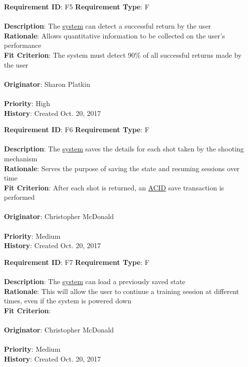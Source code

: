 \documentclass[11pt]{article}
\begin{document}
\begin{framed}
	\noindent\textbf{Requirement ID}: F5 \hfill \textbf{Requirement Type}: F \hfill\\\\
	\noindent\textbf{Description}: The \hyperref[sec:definitions]{system} can detect a successful return by the user \\
	\textbf{Rationale}: Allows quantitative information to be collected on the user's performance \\
	\textbf{Fit Criterion}: The system must detect 90\% of all successful returns made by the user\\\\
	\textbf{Originator}: Sharon Platkin \\\\
	\textbf{Priority}: High \hfill \\
	\noindent\textbf{History}: Created Oct. 20, 2017
\end{framed}

\begin{framed}
	\noindent\textbf{Requirement ID}: F6 \hfill \textbf{Requirement Type}: F \hfill\\\\
	\noindent\textbf{Description}: The \hyperref[sec:definitions]{system} saves the details for each shot taken by the shooting mechanism \\
	\textbf{Rationale}: Serves the purpose of saving the state and resuming sessions over time \\
	\textbf{Fit Criterion}: After each shot is returned, an \hyperref[sec:definitions]{ACID} save transaction is performed \\\\
	\textbf{Originator}: Christopher McDonald \\\\
	\textbf{Priority}: Medium \hfill \\
	\noindent\textbf{History}: Created Oct. 20, 2017
\end{framed}

\begin{framed}
	\noindent\textbf{Requirement ID}: F7 \hfill \textbf{Requirement Type}: F \hfill\\\\
	\noindent\textbf{Description}: The \hyperref[sec:definitions]{system} can load a previously saved state \\
	\textbf{Rationale}: This will allow the user to continue a training session at different times, even if the system is powered down \\
	\textbf{Fit Criterion}: \\\\
	\textbf{Originator}: Christopher McDonald \\\\
	\textbf{Priority}: Medium \hfill \\
	\noindent\textbf{History}: Created Oct. 20, 2017
\end{framed}
\end{document}
